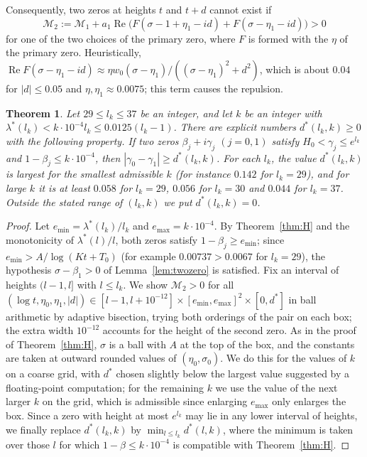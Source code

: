 \documentclass[11pt]{amsart}
\numberwithin{equation}{section}
\newtheorem{theorem}{Theorem}[section]
\theoremstyle{definition}
\theoremstyle{remark}
\newcommand{\Rp}{\operatorname{Re}}
\begin{document}
Consequently, two zeros at heights $t$ and $t + d$ cannot exist if
\[
\mathcal M_2 := \mathcal M_1 + a_1\Rp\big(F(\sigma - 1 + \eta_1 - id) + F(\sigma - \eta_1 - id)\big) > 0
\]
for one of the two choices of the primary zero, where $F$ is formed with the $\eta$ of the primary zero.
Heuristically, $\Rp F(\sigma - \eta_1 - id) \approx \eta w_0(\sigma - \eta_1)/((\sigma - \eta_1)^2 + d^2)$, which is about $0.04$ for $|d| \leq 0.05$ and $\eta, \eta_1 \approx 0.0075$; this term causes the repulsion.

\begin{theorem}\label{thm:rep}
Let $29 \leq l_k \leq 37$ be an integer, and let $k$ be an integer with $\lambda^*(l_k) < k\cdot10^{-4}l_k \leq 0.0125(l_k - 1)$.
There are explicit numbers $d^*(l_k, k) \geq 0$ with the following property.
If two zeros $\beta_j + i\gamma_j$ $(j = 0, 1)$ satisfy $H_0 < \gamma_j \leq e^{l_k}$ and $1 - \beta_j \leq k\cdot10^{-4}$, then $|\gamma_0 - \gamma_1| \geq d^*(l_k, k)$.
For each $l_k$, the value $d^*(l_k, k)$ is largest for the smallest admissible $k$ (for instance $0.142$ for $l_k = 29$), and for large $k$ it is at least $0.058$ for $l_k = 29$, $0.056$ for $l_k = 30$ and $0.044$ for $l_k = 37$.
Outside the stated range of $(l_k, k)$ we put $d^*(l_k, k) = 0$.
\end{theorem}

\begin{proof}
Let $e_{\min} = \lambda^*(l_k)/l_k$ and $e_{\max} = k\cdot10^{-4}$.
By Theorem~\ref{thm:H} and the monotonicity of $\lambda^*(l)/l$, both zeros satisfy $1 - \beta_j \geq e_{\min}$; since $e_{\min} > A/\log(Kt + T_0)$ (for example $0.00737 > 0.0067$ for $l_k = 29$), the hypothesis $\sigma - \beta_1 > 0$ of Lemma~\ref{lem:twozero} is satisfied.
Fix an interval of heights $(l - 1, l]$ with $l \leq l_k$.
We show $\mathcal M_2 > 0$ for all $(\log t, \eta_0, \eta_1, |d|) \in [l - 1, l + 10^{-12}] \times [e_{\min}, e_{\max}]^2 \times [0, d^*]$ in ball arithmetic by adaptive bisection, trying both orderings of the pair on each box; the extra width $10^{-12}$ accounts for the height of the second zero.
As in the proof of Theorem~\ref{thm:H}, $\sigma$ is a ball with $A$ at the top of the box, and the constants are taken at outward rounded values of $(\eta_0, \sigma_0)$.
We do this for the values of $k$ on a coarse grid, with $d^*$ chosen slightly below the largest value suggested by a floating-point computation; for the remaining $k$ we use the value of the next larger $k$ on the grid, which is admissible since enlarging $e_{\max}$ only enlarges the box.
Since a zero with height at most $e^{l_k}$ may lie in any lower interval of heights, we finally replace $d^*(l_k, k)$ by $\min_{l\leq l_k}d^*(l, k)$, where the minimum is taken over those $l$ for which $1 - \beta \leq k\cdot10^{-4}$ is compatible with Theorem~\ref{thm:H}.
\end{proof}
\end{document}
